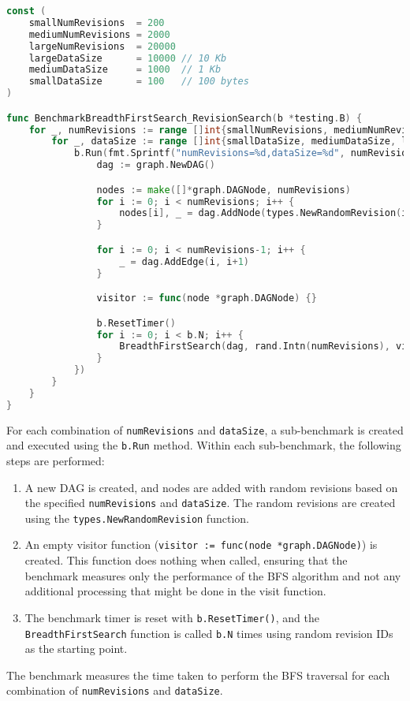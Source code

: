 \begin{lstlisting}[language=go]
const (
	smallNumRevisions  = 200
	mediumNumRevisions = 2000
	largeNumRevisions  = 20000
	largeDataSize      = 10000 // 10 Kb
	mediumDataSize     = 1000  // 1 Kb
	smallDataSize      = 100   // 100 bytes
)

func BenchmarkBreadthFirstSearch_RevisionSearch(b *testing.B) {
	for _, numRevisions := range []int{smallNumRevisions, mediumNumRevisions, largeNumRevisions} {
		for _, dataSize := range []int{smallDataSize, mediumDataSize, largeDataSize} {
			b.Run(fmt.Sprintf("numRevisions=%d,dataSize=%d", numRevisions, dataSize), func(b *testing.B) {
				dag := graph.NewDAG()

				nodes := make([]*graph.DAGNode, numRevisions)
				for i := 0; i < numRevisions; i++ {
					nodes[i], _ = dag.AddNode(types.NewRandomRevision(i, dataSize))
				}

				for i := 0; i < numRevisions-1; i++ {
					_ = dag.AddEdge(i, i+1)
				}

				visitor := func(node *graph.DAGNode) {}

				b.ResetTimer()
				for i := 0; i < b.N; i++ {
					BreadthFirstSearch(dag, rand.Intn(numRevisions), visitor)
				}
			})
		}
	}
}
\end{lstlisting}
\medskip

For each combination of \lstinline{numRevisions} and \lstinline{dataSize}, a sub-benchmark is created and executed using the \lstinline{b.Run} method. Within each sub-benchmark, the following steps are performed:
\begin{enumerate}
    \item A new DAG is created, and nodes are added with random revisions based on the specified \lstinline{numRevisions} and \lstinline{dataSize}. The random revisions are created using the \lstinline{types.NewRandomRevision} function.
    \item An empty visitor function (\lstinline{visitor := func(node *graph.DAGNode)}) is created. This function does nothing when called, ensuring that the benchmark measures only the performance of the BFS algorithm and not any additional processing that might be done in the visit function.
    \item The benchmark timer is reset with \lstinline{b.ResetTimer()}, and the \lstinline{BreadthFirstSearch} function is called \lstinline{b.N} times using random revision IDs as the starting point.
\end{enumerate}
The benchmark measures the time taken to perform the BFS traversal for each combination of \lstinline{numRevisions} and \lstinline{dataSize}.

